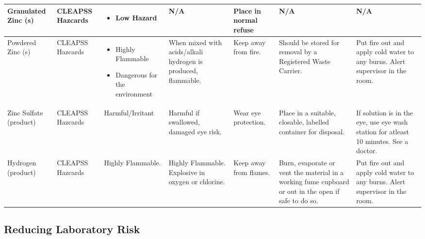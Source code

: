 \begin{landscape}
\begin{center}
\begin{longtable}{|p{1.5cm}|p{1.5cm}|p{3cm}|p{3cm}|p{3cm}|p{3cm}|p{2cm}|}
Granulated Zinc (s) &
CLEAPSS Hazcards &
\begin{itemize}
\item Low Hazard \end{itemize} &
N/A &
Place in normal refuse &
N/A &
N/A \\ \hline

Powdered Zinc (s) &
CLEAPSS Hazcards &
\begin{itemize}
\item Highly Flammable
\item Dangerous for the environment \end{itemize} &
When mixed with acids/alkali hydrogen is produced, flammable. &
Keep away from fire. &
Should be stored for removal by a Registered Waste Carrier. &
Put fire out and apply cold water to any burns. Alert supervisor in the room.
\\ \hline 

Zinc Sulfate (product) &
CLEAPSS Hazcards
& Harmful/Irritant
&Harmful if swallowed, damaged eye risk.
& Wear eye protection.
& Place in a suitable, closable, labelled container for disposal.
& If solution is in the eye, use eye wash station for atleast 10 minutes. See a doctor. 

\\ \hline

Hydrogen (product) &
CLEAPSS Hazcards
& Highly Flammable.
& Highly Flammable. Explosive in oxygen or chlorine. 
& Keep away from flames.
& Burn, evaporate or vent the material in a working fume cupboard or out in the open if safe to do so.
& Put fire out and apply cold water to any burns. Alert supervisor in the room.

\\ \hline



\end{longtable}
\label{tab:Risk Assessment Table}

\end{center}

\end{landscape}




\subsection{Reducing Laboratory Risk}


